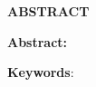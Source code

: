 \begin{center}
  \textbf{\large{ABSTRACT}	}
\end{center}


\begin{small}

\textbf{Abstract:} 


\textbf{Keywords}: \textit{}


\end{small}
